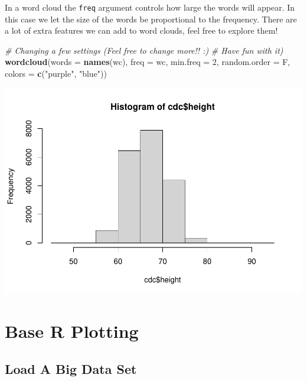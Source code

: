 \documentclass[
]{book}
\newenvironment{Shaded}{\begin{snugshade}}{\end{snugshade}}
\newcommand{\CommentTok}[1]{\textcolor[rgb]{0.56,0.35,0.01}{\textit{#1}}}
\newcommand{\DataTypeTok}[1]{\textcolor[rgb]{0.13,0.29,0.53}{#1}}
\newcommand{\DecValTok}[1]{\textcolor[rgb]{0.00,0.00,0.81}{#1}}
\newcommand{\KeywordTok}[1]{\textcolor[rgb]{0.13,0.29,0.53}{\textbf{#1}}}
\newcommand{\NormalTok}[1]{#1}
\newcommand{\StringTok}[1]{\textcolor[rgb]{0.31,0.60,0.02}{#1}}
\begin{document}
In a word cloud the \texttt{freq} argument controls how large the words will appear. In this case we let the size of the words be proportional to the frequency. There are a lot of extra features we can add to word clouds, feel free to explore them!

\begin{Shaded}
\begin{Highlighting}[]
\CommentTok{# Changing a few settings (Feel free to change more!! :)}
\CommentTok{# Have fun with it)}
\KeywordTok{wordcloud}\NormalTok{(}\DataTypeTok{words =} \KeywordTok{names}\NormalTok{(wc), }\DataTypeTok{freq =}\NormalTok{ wc, }\DataTypeTok{min.freq =} \DecValTok{2}\NormalTok{, }\DataTypeTok{random.order =}\NormalTok{ F,}
    \DataTypeTok{colors =} \KeywordTok{c}\NormalTok{(}\StringTok{"purple"}\NormalTok{, }\StringTok{"blue"}\NormalTok{))}
\end{Highlighting}
\end{Shaded}

\includegraphics{_main_files/figure-latex/unnamed-chunk-219-1.pdf}

\hypertarget{base-r-plotting}{%
\chapter{Base R Plotting}\label{base-r-plotting}}

\hypertarget{load-a-big-data-set}{%
\section{Load A Big Data Set}\label{load-a-big-data-set}}
\end{document}
